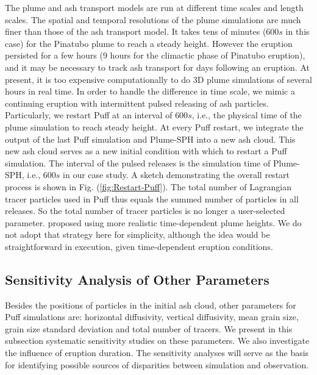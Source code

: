 \documentclass[utf8]{frontiersSCNS} %
\begin{document}
The plume and ash transport models are run at different time scales and length scales. The spatial and temporal resolutions of the plume simulations are much finer than those of the ash transport model. It takes tens of minutes ($600 s$ in this case) for the Pinatubo plume to reach a steady height. However the eruption persisted for a few hours (9 hours for the climactic phase of Pinatubo eruption), and it may be necessary to track ash transport for days following an eruption. At present, it is too expensive computationally to do 3D plume simulations of several hours in real time. In order to handle the difference in time scale, we mimic a continuing eruption with intermittent pulsed releasing of ash particles. Particularly, we restart Puff at an interval of $600 s$, i.e., the physical time of the plume simulation to reach steady height. At every Puff restart, we integrate the output of the last Puff simulation and Plume-SPH into a new ash cloud. This new ash cloud serves as a new initial condition with which to restart a Puff simulation. The interval of the pulsed releases is the simulation time of Plume-SPH, i.e., $600 s$ in our case study. A sketch demonstrating the overall restart process is shown in Fig. (\ref{fig:Restart-Puff}). The total number of Lagrangian tracer particles used in Puff thus equals the summed number of particles in all releases. So the total number of tracer particles is no longer a user-selected parameter.
\citet{fero2008simulation} proposed using more realistic time-dependent plume heights. We do not adopt that strategy here for simplicity, although the idea would be straightforward in execution, given time-dependent eruption conditions.

\subsection{Sensitivity Analysis of Other Parameters}

Besides the positions of particles in the initial ash cloud, other parameters for Puff simulations are: horizontal diffusivity, vertical diffusivity, mean grain size, grain size standard deviation and total number of tracers. We present in this subsection systematic sensitivity studies on these parameters. We also investigate the influence of eruption duration. The sensitivity analyses will serve as the basis for identifying possible sources of disparities between simulation and observation.
\end{document}
